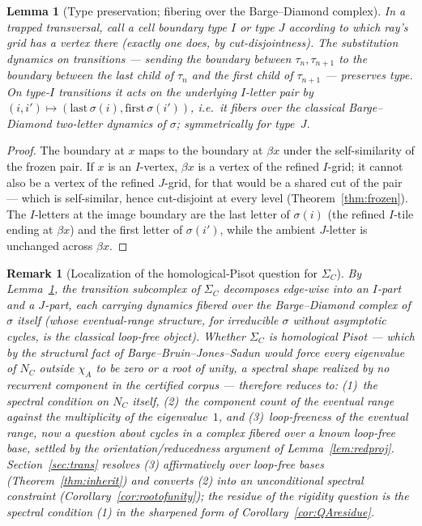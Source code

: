 \documentclass[11pt]{article}
\newtheorem{lemma}[theorem]{Lemma}
\newtheorem{remark}[theorem]{Remark}
\begin{document}
\begin{lemma}[Type preservation; fibering over the Barge--Diamond
complex]\label{lem:type}
In a trapped transversal, call a cell boundary \emph{type $I$} or
\emph{type $J$} according to which ray's grid has a vertex there
(exactly one does, by cut-disjointness). The substitution dynamics on
transitions --- sending the boundary between $\tau_n,\tau_{n+1}$ to the
boundary between the last child of $\tau_n$ and the first child of
$\tau_{n+1}$ --- preserves type. On type-$I$ transitions it acts on the
underlying $I$-letter pair by $(i,i')\mapsto(\mathrm{last}\,\sigma(i),
\mathrm{first}\,\sigma(i'))$, i.e.\ it fibers over the classical
Barge--Diamond two-letter dynamics of $\sigma$; symmetrically for
type~$J$.
\end{lemma}

\begin{proof}
The boundary at $x$ maps to the boundary at $\beta x$ under the
self-similarity of the frozen pair. If $x$ is an $I$-vertex, $\beta x$
is a vertex of the refined $I$-grid; it cannot also be a vertex of the
refined $J$-grid, for that would be a shared cut of the pair --- which
is self-similar, hence cut-disjoint at every level
(Theorem~\ref{thm:frozen}). The $I$-letters at the image boundary are
the last letter of $\sigma(i)$ (the refined $I$-tile ending at
$\beta x$) and the first letter of $\sigma(i')$, while the ambient
$J$-letter is unchanged across $\beta x$.
\end{proof}

\begin{remark}[Localization of the homological-Pisot question for
$\Sigma_C$]\label{rem:QA}
By Lemma~\ref{lem:type}, the transition subcomplex of $\Sigma_C$
decomposes edge-wise into an $I$-part and a $J$-part, each carrying
dynamics fibered over the Barge--Diamond complex of $\sigma$ itself
(whose eventual-range structure, for irreducible $\sigma$ without
asymptotic cycles, is the classical loop-free object). Whether
$\Sigma_C$ is homological Pisot --- which by the structural fact of
Barge--Bruin--Jones--Sadun would force every eigenvalue of $N_C$
outside $\chi_A$ to be zero or a root of unity, a spectral shape
realized by no recurrent component in the certified corpus ---
therefore reduces to: (1)~the spectral condition on $N_C$ itself,
(2)~the component count of the eventual range against the multiplicity
of the eigenvalue~$1$, and (3)~loop-freeness of the eventual range,
now a question about cycles in a complex fibered over a known
loop-free base, settled by the orientation/reducedness argument of
Lemma~\ref{lem:redproj}. Section~\ref{sec:trans}
resolves (3) affirmatively over loop-free bases
(Theorem~\ref{thm:inherit}) and converts (2) into an unconditional
spectral constraint (Corollary~\ref{cor:rootofunity}); the residue of
the rigidity question is the spectral condition (1) in the sharpened
form of Corollary~\ref{cor:QAresidue}.
\end{remark}
\end{document}
